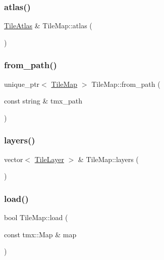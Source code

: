 \subsubsection{\texorpdfstring{atlas()}{atlas()}}
{\footnotesize\ttfamily \hyperlink{classpixel_1_1_tile_atlas}{Tile\+Atlas} \& Tile\+Map\+::atlas (\begin{DoxyParamCaption}{ }\end{DoxyParamCaption})}

\mbox{\label{classpixel_1_1_tile_map_a77e1743a14959704fb14a94948f7af66}} 
\subsubsection{\texorpdfstring{from\+\_\+path()}{from\_path()}}
{\footnotesize\ttfamily unique\+\_\+ptr$<$ \hyperlink{classpixel_1_1_tile_map}{Tile\+Map} $>$ Tile\+Map\+::from\+\_\+path (\begin{DoxyParamCaption}\item[{const string \&}]{tmx\+\_\+path }\end{DoxyParamCaption})\hspace{0.3cm}{\ttfamily [static]}}

\mbox{\label{classpixel_1_1_tile_map_a40f23bebe94eee1130692085235c14d5}} 
\subsubsection{\texorpdfstring{layers()}{layers()}}
{\footnotesize\ttfamily vector$<$ \hyperlink{classpixel_1_1_tile_layer}{Tile\+Layer} $>$ \& Tile\+Map\+::layers (\begin{DoxyParamCaption}{ }\end{DoxyParamCaption})}

\mbox{\label{classpixel_1_1_tile_map_a80157d358cbf2eac67adf489057f12fe}} 
\subsubsection{\texorpdfstring{load()}{load()}}
{\footnotesize\ttfamily bool Tile\+Map\+::load (\begin{DoxyParamCaption}\item[{const tmx\+::\+Map \&}]{map }\end{DoxyParamCaption})}

